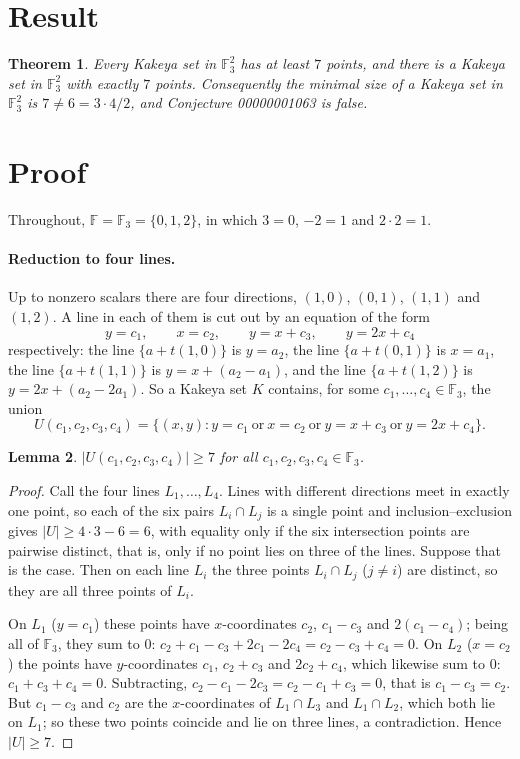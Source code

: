 \documentclass[11pt]{article}
\theoremstyle{plain}
\newtheorem{theorem}{Theorem}
\newtheorem{lemma}[theorem]{Lemma}
\theoremstyle{definition}
\theoremstyle{remark}
\newcommand{\F}{\mathbb F}
\begin{document}
\section{Result}

\begin{theorem}\label{thm:main}
Every Kakeya set in $\F_3^2$ has at least $7$ points, and there is a Kakeya set
in $\F_3^2$ with exactly $7$ points. Consequently the minimal size of a Kakeya
set in $\F_3^2$ is $7\ne 6=3\cdot4/2$, and Conjecture 00000001063 is false.
\end{theorem}

\section{Proof}

Throughout, $\F=\F_3=\{0,1,2\}$, in which $3=0$, $-2=1$ and $2\cdot2=1$.

\paragraph{Reduction to four lines.}
Up to nonzero scalars there are four directions,
$(1,0)$, $(0,1)$, $(1,1)$ and $(1,2)$. A line in each of them is cut out by an
equation of the form
\[
  y=c_1,\qquad x=c_2,\qquad y=x+c_3,\qquad y=2x+c_4
\]
respectively: the line $\{a+t(1,0)\}$ is $y=a_2$, the line $\{a+t(0,1)\}$ is
$x=a_1$, the line $\{a+t(1,1)\}$ is $y=x+(a_2-a_1)$, and the line
$\{a+t(1,2)\}$ is $y=2x+(a_2-2a_1)$. So a Kakeya set $K$ contains, for some
$c_1,\dots,c_4\in\F_3$, the union
\[
  U(c_1,c_2,c_3,c_4)=\{(x,y) : y=c_1\ \text{or}\ x=c_2\ \text{or}\ y=x+c_3\
  \text{or}\ y=2x+c_4\}.
\]

\begin{lemma}\label{lem:seven}
$|U(c_1,c_2,c_3,c_4)|\ge7$ for all $c_1,c_2,c_3,c_4\in\F_3$.
\end{lemma}

\begin{proof}
Call the four lines $L_1,\dots,L_4$. Lines with different directions meet in
exactly one point, so each of the six pairs $L_i\cap L_j$ is a single point and
inclusion--exclusion gives $|U|\ge 4\cdot3-6=6$, with equality only if the six
intersection points are pairwise distinct, that is, only if no point lies on
three of the lines. Suppose that is the case. Then on each line $L_i$ the three
points $L_i\cap L_j$ ($j\ne i$) are distinct, so they are all three points of
$L_i$.

On $L_1$ ($y=c_1$) these points have $x$-coordinates $c_2$, $c_1-c_3$ and
$2(c_1-c_4)$; being all of $\F_3$, they sum to $0$:
$c_2+c_1-c_3+2c_1-2c_4=c_2-c_3+c_4=0$.
On $L_2$ ($x=c_2$) the points have $y$-coordinates $c_1$, $c_2+c_3$ and
$2c_2+c_4$, which likewise sum to $0$: $c_1+c_3+c_4=0$.
Subtracting, $c_2-c_1-2c_3=c_2-c_1+c_3=0$, that is $c_1-c_3=c_2$. But $c_1-c_3$
and $c_2$ are the $x$-coordinates of $L_1\cap L_3$ and $L_1\cap L_2$, which
both lie on $L_1$; so these two points coincide and lie on three lines, a
contradiction. Hence $|U|\ge7$.
\end{proof}
\end{document}

